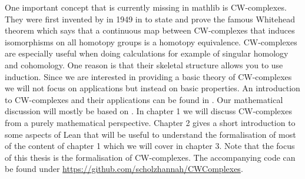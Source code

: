 One important concept that is currently missing in mathlib is CW-complexes. 
They were first invented by  in 1949 in \cite{Whitehead2018} to state and prove the famous Whitehead theorem which says that a continuous map between CW-complexes that induces isomorphisms on all homotopy groups is a homotopy equivalence.
CW-complexes are especially useful when doing calculations for example of singular homology and cohomology. 
One reason is that their skeletal structure allows you to use induction.
Since we are interested in providing a basic theory of CW-complexes we will not focus on applications but instead on basic properties. 
An introduction to CW-complexes and their applications can be found in \cite{Lundell1969}.
Our mathematical discussion will mostly be based on \cite{Hatcher2001}.
In chapter 1 we will discuss CW-complexes from a purely mathematical perspective. 
Chapter 2 gives a short introduction to some aspects of Lean that will be useful to understand the formalisation of most of the content of chapter 1 which we will cover in chapter 3. 
Note that the focus of this thesis is the formalisation of CW-complexes. 
The accompanying code can be found under \url{https://github.com/scholzhannah/CWComplexes}.